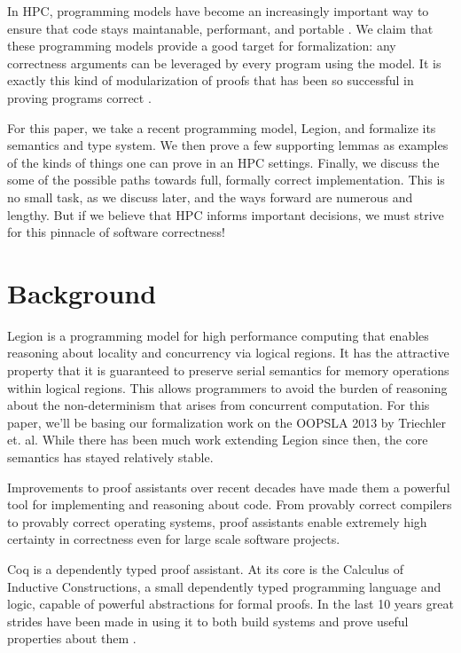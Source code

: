 \documentclass[sigplan]{acmart}
\begin{document}
In HPC, programming models have become an increasingly important way to ensure
that code stays maintanable, performant, and portable \cite{?}. We claim that
these programming models provide a good target for formalization: any
correctness arguments can be leveraged by every program using the model. It is
exactly this kind of modularization of proofs that has been so successful in
proving programs correct \cite{?}.

For this paper, we take a recent programming model, Legion, and formalize its
semantics and type system. We then prove a few supporting lemmas as examples of
the kinds of things one can prove in an HPC settings. Finally, we discuss the
some of the possible paths towards full, formally correct implementation. This
is no small task, as we discuss later, and the ways forward are numerous and
lengthy. But if we believe that HPC informs important decisions, we must strive
for this pinnacle of software correctness!

\section{Background}

Legion is a programming model for high performance computing that enables
reasoning about locality and concurrency via logical regions. It has the
attractive property that it is guaranteed to preserve serial semantics for
memory operations within logical regions. This allows programmers to avoid the
burden of reasoning about the non-determinism that arises from concurrent
computation. For this paper, we'll be basing our formalization work on the
OOPSLA 2013 by Triechler et. al.  While there has been much work extending
Legion since then, the core semantics has stayed relatively stable.

Improvements to proof assistants over recent decades have made them a powerful
tool for implementing and reasoning about code. From provably correct compilers
to provably correct operating systems, proof assistants enable extremely high
certainty in correctness even for large scale software projects. 

Coq is a dependently typed proof assistant. At its core is the Calculus of
Inductive Constructions, a small dependently typed programming language and
logic, capable of powerful abstractions for formal proofs. In the last 10 years 
great strides have been made in using it to both build systems and prove useful
properties about them \cite{compcert, certicoq, chlipala...}. 
\end{document}
